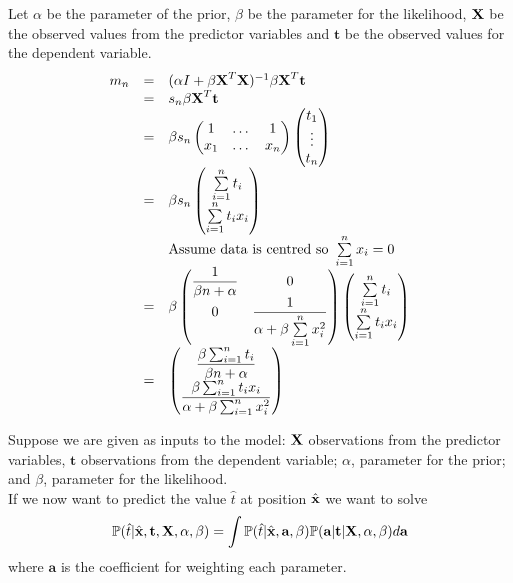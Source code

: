 \documentclass[11pt,a4paper]{article}
\begin{document}
Let $\alpha$ be the parameter of the prior, $\beta$ be the parameter for the likelihood, $\textbf{X}$ be the observed values from the predictor variables and $\textbf{t}$ be the observed values for the dependent variable.
\[\begin{array}{rcl}
m_n&=&(\alpha I+\beta \textbf{X}^T\textbf{X})^{-1}\beta \textbf{X}^T\textbf{t}\\
&=&s_n\beta\textbf{X}^T\textbf{t}\\
&=&\beta s_n\begin{pmatrix}
1&\dots&1\\
x_1&\dots&x_n
\end{pmatrix}
\begin{pmatrix}
t_1\\
\vdots\\
t_n
\end{pmatrix}\\
&=&\beta s_n\begin{pmatrix}
\sum\limits_{i=1}^nt_i\\
\sum\limits_{i=1}^nt_ix_i
\end{pmatrix}\\
&&\text{Assume data is centred so }\sum\limits_{i=1}^nx_i=0\\
&=&\beta\begin{pmatrix}
\dfrac{1}{\beta n+\alpha}&0\\
0&\dfrac{1}{\alpha+\beta\sum\limits_{i=1}^nx_i^2}
\end{pmatrix}\begin{pmatrix}
\sum\limits_{i=1}^nt_i\\
\sum\limits_{i=1}^nt_ix_i
\end{pmatrix}\\
&=&\begin{pmatrix}
\dfrac{\beta\sum_{i=1}^nt_i}{\beta n+\alpha}\\
\dfrac{\beta\sum_{i=1}^nt_ix_i}{\alpha+\beta\sum_{i=1}^nx_i^2}
\end{pmatrix}
\end{array}\]

Suppose we are given as inputs to the model: $\textbf{X}$ observations from the predictor variables, $\textbf{t}$ observations from the dependent variable; $\alpha$, parameter for the prior; and $\beta$, parameter for the likelihood.\\
If we now want to predict the value $\hat{t}$ at position $\hat{\textbf{x}}$ we want to solve
$$\mathbb{P}(\hat{t}|\hat{\textbf{x}},\textbf{t},\textbf{X},\alpha,\beta)=\int\mathbb{P}(\hat{t}|\hat{\textbf{x}},\textbf{a},\beta)\mathbb{P}(\textbf{a}|\textbf{t}|\textbf{X},\alpha,\beta)d\textbf{a}$$
where $\textbf{a}$ is the coefficient for weighting each parameter.
\end{document}
